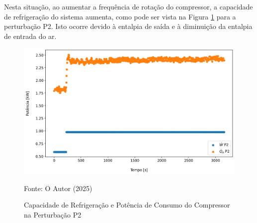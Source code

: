 Nesta situação, ao aumentar a frequência de rotação do compressor, a capacidade de refrigeração do sistema aumenta, como pode ser vista na Figura \ref{fig:Capacidade de Resfriamento e Potência de Consumo do Compressor P2} para a perturbação P2. Isto ocorre devido à entalpia de saída e à diminuição da entalpia de entrada do ar.
\newpage
\begin{figure}[h]
    \centering
    \includegraphics[width=1\linewidth]{FigurasdoTexto/Qe e W Perturbação Rot.png}
    \caption{Capacidade de Refrigeração e Potência de Consumo do Compressor na Perturbação P2}
    \label{fig:Capacidade de Resfriamento e Potência de Consumo do Compressor P2}
    {\footnotesize Fonte: O Autor (2025)}
\end{figure}

